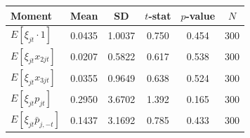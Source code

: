 \begin{tabular}{lccccc}
\toprule
Moment & Mean & SD & $t$-stat & $p$-value & $N$ \\
\midrule
$E[\xi_{jt}\cdot 1]$ & 0.0435 & 1.0037 & 0.750 & 0.454 & 300 \\
$E[\xi_{jt}x_{2jt}]$ & 0.0207 & 0.5822 & 0.617 & 0.538 & 300 \\
$E[\xi_{jt}x_{3jt}]$ & 0.0355 & 0.9649 & 0.638 & 0.524 & 300 \\
$E[\xi_{jt}p_{jt}]$ & 0.2950 & 3.6702 & 1.392 & 0.165 & 300 \\
$E[\xi_{jt}\bar p_{j,-t}]$ & 0.1437 & 3.1692 & 0.785 & 0.433 & 300 \\
\bottomrule
\end{tabular}
